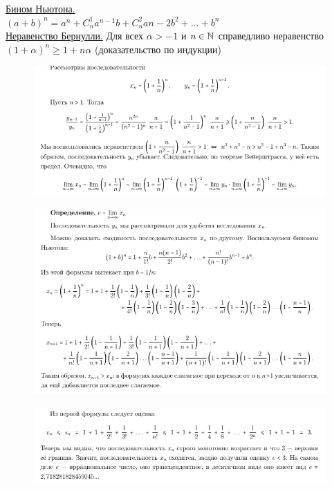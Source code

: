 \underline{Бином Ньютона.}\\
$(a+b)^n = a^n + C_{n}^1 a^{n - 1} b + C_{n}^2 a{n - 2} b^2 + ... + b^n$ \\
\underline{Неравенство Бернулли.} Для всех $\alpha > -1$ и $n \in \mathbb{N}$ справедливо неравенство  \\
$(1 + \alpha)^n \geq 1 + n \alpha$ (доказательство по индукции) \\
 \begin{figure}[h!]
\centering
\includegraphics[scale=0.6]{Pictures/20_1.png}
\end{figure}
 \begin{figure}[h!]
\centering
\includegraphics[scale=0.6]{Pictures/20_2.png}
\end{figure}
 \begin{figure}[h!]
\centering
\includegraphics[scale=0.6]{Pictures/20_3.png}
\end{figure}
\newpage

